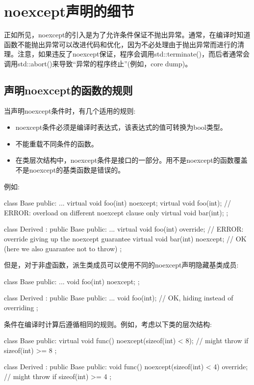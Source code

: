 \section{noexcept声明的细节}
正如所见，noexcept的引入是为了允许条件保证不抛出异常。通常，在编译时知道函数不能抛出异常可以改进代码和优化，因为不必处理由于抛出异常而进行的清理。注意，如果违反了noexcept保证，程序会调用std::terminate()，而后者通常会调用std::abort()来导致“异常的程序终止”(例如，core dump)。

\subsection{声明noexcept的函数的规则}

当声明noexcept条件时，有几个适用的规则:

\begin{itemize}
	\item noexcept条件必须是编译时表达式，该表达式的值可转换为bool类型。
	\item 不能重载不同条件的函数。
	\item 在类层次结构中，noexcept条件是接口的一部分。用不是noexcept的函数覆盖不是noexcept的基类函数是错误的。
\end{itemize}

例如:

\begin{cppcode}
class Base {
	public:
	...
	virtual void foo(int) noexcept;
	virtual void foo(int); // ERROR: overload on different noexcept clause only
	virtual void bar(int);
};

class Derived : public Base {
	public:
	...
	virtual void foo(int) override; // ERROR: override giving up the noexcept guarantee
	virtual void bar(int) noexcept; // OK (here we also guarantee not to throw)
};
\end{cppcode}

但是，对于非虚函数，派生类成员可以使用不同的noexcept声明隐藏基类成员:

\begin{cppcode}
class Base {
	public:
	...
	void foo(int) noexcept;
};

class Derived : public Base {
	public:
	...
	void foo(int); // OK, hiding instead of overriding
};
\end{cppcode}

条件在编译时计算后遵循相同的规则。例如，考虑以下类的层次结构:

\begin{cppcode}
class Base {
	public:
	virtual void func() noexcept(sizeof(int) < 8); // might throw if sizeof(int) >= 8
};

class Derived : public Base {
	public:
	void func() noexcept(sizeof(int) < 4) override; // might throw if sizeof(int) >= 4
};
\end{cppcode}

